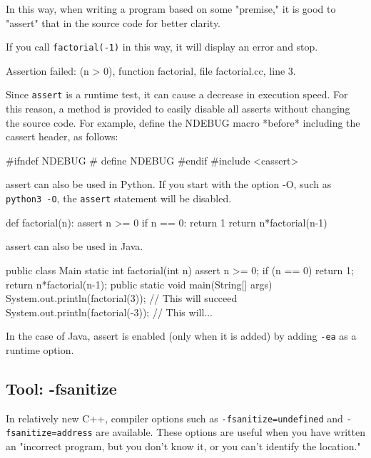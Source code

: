 In this way, when writing a program based on some "premise," it is good to "assert" that in the source code for better clarity.

If you call \texttt{factorial(-1)} in this way, it will display an error and stop.

\begin{terminal}
Assertion failed: (n > 0), function factorial, file factorial.cc, line 3.
\end{terminal}

Since \texttt{assert} is a runtime test, it can cause a decrease in execution speed.
For this reason, a method is provided to easily disable all asserts without changing the source code.
For example, define the NDEBUG macro *before* including the cassert header, as follows:
\begin{cbox}[emph={NDEBUG}]
#ifndef NDEBUG
#  define NDEBUG
#endif
#include <cassert>
\end{cbox}

assert can also be used in Python. If you start with the option -O, such as \texttt{python3 -O}, the \texttt{assert} statement will be disabled.

\begin{pybox}[emph=assert]
def factorial(n):
    assert n >= 0
    if n == 0:
        return 1
    return n*factorial(n-1)
\end{pybox}

assert can also be used in Java.
\begin{javabox}[emph={Main,assert}]
public class Main {
    static int factorial(int n) {
	assert n >= 0;
	if (n == 0) return 1;
	return n*factorial(n-1);
    }
    public static void main(String[] args) {
	System.out.println(factorial(3));  // This will succeed
	System.out.println(factorial(-3)); // This will...
    }
}
\end{javabox}

In the case of Java, assert is enabled (only when it is added) by adding \texttt{-ea} as a runtime option.
\subsection{Tool: -fsanitize}\label{section:cpp-sanitize}
In relatively new C++, compiler options such as \texttt{-fsanitize=undefined} and \texttt{-fsanitize=address} are available.
These options are useful when you have written an "incorrect program, but you don't know it, or you can't identify the location."

